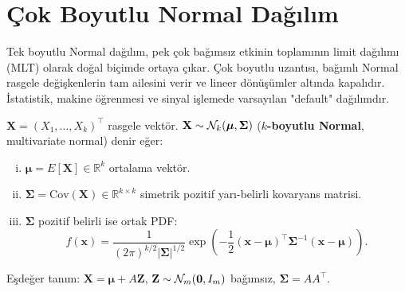 \section{Çok Boyutlu Normal Dağılım}
\label{sec:cok_boyutlu_normal}

\begin{motivasyon}
Tek boyutlu Normal dağılım, pek çok bağımsız etkinin toplamının limit dağılımı
(MLT) olarak doğal biçimde ortaya çıkar.
Çok boyutlu uzantısı, bağımlı Normal rasgele değişkenlerin tam ailesini verir
ve lineer dönüşümler altında kapalıdır.
İstatistik, makine öğrenmesi ve sinyal işlemede varsayılan "default" dağılımdır.
\end{motivasyon}

\begin{tanim}
\label{def:cok_boyutlu_normal}
$\mathbf{X} = (X_1, \ldots, X_k)^\top$ rasgele vektör.
$\mathbf{X} \sim \mathcal{N}_k(\boldsymbol{\mu}, \boldsymbol{\Sigma})$
(\textbf{$k$-boyutlu Normal}, multivariate normal) denir eğer:
\begin{enumerate}[(i)]
  \item $\boldsymbol{\mu} = E[\mathbf{X}] \in \mathbb{R}^k$ ortalama vektör.
  \item $\boldsymbol{\Sigma} = \mathrm{Cov}(\mathbf{X}) \in \mathbb{R}^{k\times k}$ simetrik pozitif yarı-belirli kovaryans matrisi.
  \item $\boldsymbol{\Sigma}$ pozitif belirli ise ortak PDF:
  \[
    f(\mathbf{x}) = \frac{1}{(2\pi)^{k/2}|\boldsymbol{\Sigma}|^{1/2}}
    \exp\!\left(-\frac{1}{2}(\mathbf{x}-\boldsymbol{\mu})^\top \boldsymbol{\Sigma}^{-1}(\mathbf{x}-\boldsymbol{\mu})\right).
  \]
\end{enumerate}
Eşdeğer tanım: $\mathbf{X} = \boldsymbol{\mu} + A\mathbf{Z}$, $\mathbf{Z} \sim \mathcal{N}_m(\mathbf{0}, I_m)$ bağımsız,
$\boldsymbol{\Sigma} = AA^\top$.
\end{tanim}

